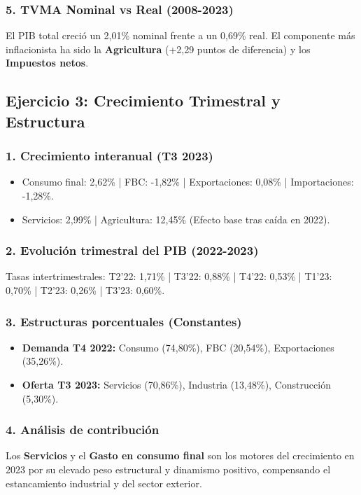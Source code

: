 \subsubsection{5. TVMA Nominal vs Real (2008-2023)}
El PIB total creció un 2,01\% nominal frente a un 0,69\% real. El componente más inflacionista ha sido la \textbf{Agricultura} (+2,29 puntos de diferencia) y los \textbf{Impuestos netos}.

\subsection{Ejercicio 3: Crecimiento Trimestral y Estructura}

\subsubsection{1. Crecimiento interanual (T3 2023)}
\begin{itemize}
    \item Consumo final: 2,62\% | FBC: -1,82\% | Exportaciones: 0,08\% | Importaciones: -1,28\%.
    \item Servicios: 2,99\% | Agricultura: 12,45\% (Efecto base tras caída en 2022).
\end{itemize}

\subsubsection{2. Evolución trimestral del PIB (2022-2023)}
Tasas intertrimestrales: T2'22: 1,71\% | T3'22: 0,88\% | T4'22: 0,53\% | T1'23: 0,70\% | T2'23: 0,26\% | T3'23: 0,60\%.

\subsubsection{3. Estructuras porcentuales (Constantes)}
\begin{itemize}
    \item \textbf{Demanda T4 2022:} Consumo (74,80\%), FBC (20,54\%), Exportaciones (35,26\%).
    \item \textbf{Oferta T3 2023:} Servicios (70,86\%), Industria (13,48\%), Construcción (5,30\%).
\end{itemize}

\subsubsection{4. Análisis de contribución}
Los \textbf{Servicios} y el \textbf{Gasto en consumo final} son los motores del crecimiento en 2023 por su elevado peso estructural y dinamismo positivo, compensando el estancamiento industrial y del sector exterior.

